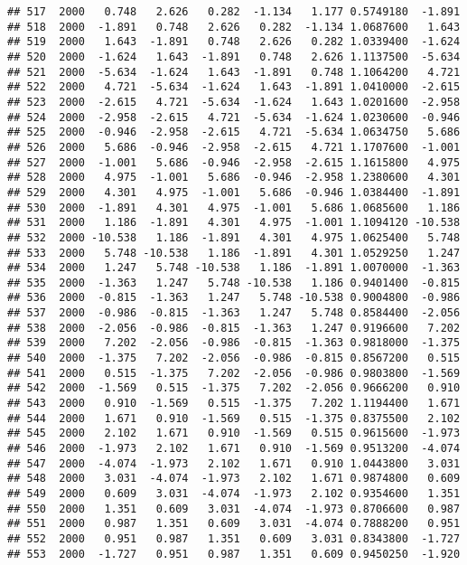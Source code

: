 \documentclass[]{article}
\begin{document}
\begin{verbatim}
## 517  2000   0.748   2.626   0.282  -1.134   1.177 0.5749180  -1.891
## 518  2000  -1.891   0.748   2.626   0.282  -1.134 1.0687600   1.643
## 519  2000   1.643  -1.891   0.748   2.626   0.282 1.0339400  -1.624
## 520  2000  -1.624   1.643  -1.891   0.748   2.626 1.1137500  -5.634
## 521  2000  -5.634  -1.624   1.643  -1.891   0.748 1.1064200   4.721
## 522  2000   4.721  -5.634  -1.624   1.643  -1.891 1.0410000  -2.615
## 523  2000  -2.615   4.721  -5.634  -1.624   1.643 1.0201600  -2.958
## 524  2000  -2.958  -2.615   4.721  -5.634  -1.624 1.0230600  -0.946
## 525  2000  -0.946  -2.958  -2.615   4.721  -5.634 1.0634750   5.686
## 526  2000   5.686  -0.946  -2.958  -2.615   4.721 1.1707600  -1.001
## 527  2000  -1.001   5.686  -0.946  -2.958  -2.615 1.1615800   4.975
## 528  2000   4.975  -1.001   5.686  -0.946  -2.958 1.2380600   4.301
## 529  2000   4.301   4.975  -1.001   5.686  -0.946 1.0384400  -1.891
## 530  2000  -1.891   4.301   4.975  -1.001   5.686 1.0685600   1.186
## 531  2000   1.186  -1.891   4.301   4.975  -1.001 1.1094120 -10.538
## 532  2000 -10.538   1.186  -1.891   4.301   4.975 1.0625400   5.748
## 533  2000   5.748 -10.538   1.186  -1.891   4.301 1.0529250   1.247
## 534  2000   1.247   5.748 -10.538   1.186  -1.891 1.0070000  -1.363
## 535  2000  -1.363   1.247   5.748 -10.538   1.186 0.9401400  -0.815
## 536  2000  -0.815  -1.363   1.247   5.748 -10.538 0.9004800  -0.986
## 537  2000  -0.986  -0.815  -1.363   1.247   5.748 0.8584400  -2.056
## 538  2000  -2.056  -0.986  -0.815  -1.363   1.247 0.9196600   7.202
## 539  2000   7.202  -2.056  -0.986  -0.815  -1.363 0.9818000  -1.375
## 540  2000  -1.375   7.202  -2.056  -0.986  -0.815 0.8567200   0.515
## 541  2000   0.515  -1.375   7.202  -2.056  -0.986 0.9803800  -1.569
## 542  2000  -1.569   0.515  -1.375   7.202  -2.056 0.9666200   0.910
## 543  2000   0.910  -1.569   0.515  -1.375   7.202 1.1194400   1.671
## 544  2000   1.671   0.910  -1.569   0.515  -1.375 0.8375500   2.102
## 545  2000   2.102   1.671   0.910  -1.569   0.515 0.9615600  -1.973
## 546  2000  -1.973   2.102   1.671   0.910  -1.569 0.9513200  -4.074
## 547  2000  -4.074  -1.973   2.102   1.671   0.910 1.0443800   3.031
## 548  2000   3.031  -4.074  -1.973   2.102   1.671 0.9874800   0.609
## 549  2000   0.609   3.031  -4.074  -1.973   2.102 0.9354600   1.351
## 550  2000   1.351   0.609   3.031  -4.074  -1.973 0.8706600   0.987
## 551  2000   0.987   1.351   0.609   3.031  -4.074 0.7888200   0.951
## 552  2000   0.951   0.987   1.351   0.609   3.031 0.8343800  -1.727
## 553  2000  -1.727   0.951   0.987   1.351   0.609 0.9450250  -1.920

\end{verbatim}
\end{document}
